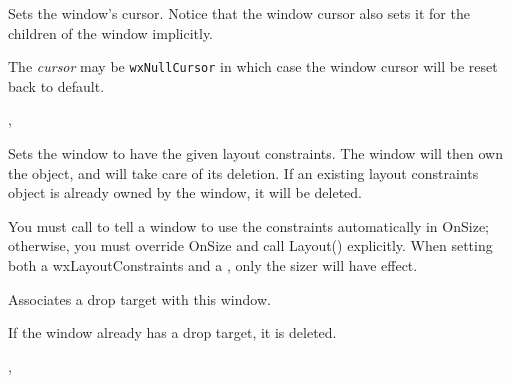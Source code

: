 
Sets the window's cursor. Notice that the window cursor also sets it for the
children of the window implicitly.

The {\it cursor} may be {\tt wxNullCursor} in which case the window cursor will
be reset back to default.




, 

\label{wxwindowsetconstraints}


Sets the window to have the given layout constraints. The window
will then own the object, and will take care of its deletion.
If an existing layout constraints object is already owned by the
window, it will be deleted.




You must call  to tell a window to use
the constraints automatically in OnSize; otherwise, you must override OnSize and call Layout()
explicitly. When setting both a wxLayoutConstraints and a , only the
sizer will have effect.

\label{wxwindowsetdroptarget}


Associates a drop target with this window.

If the window already has a drop target, it is deleted.


,

\label{wxwindowseteventhandler}

